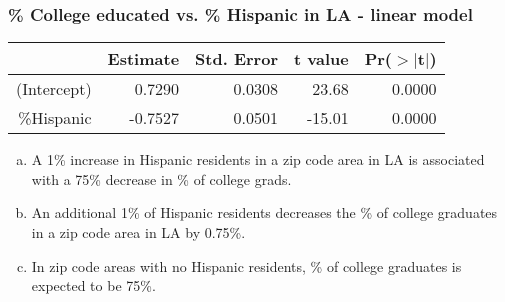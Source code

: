 \documentclass[slidestop,compress,mathserif]{beamer}
\begin{document}

\begin{frame}
\frametitle{\% College educated vs. \% Hispanic in LA - linear model}


{\small
\begin{center}
\begin{tabular}{rrrrr}
  \hline
 & Estimate & Std. Error & t value & Pr($>$$|$t$|$) \\ 
  \hline
(Intercept) & 0.7290 & 0.0308 & 23.68 & 0.0000 \\ 
 \%Hispanic & -0.7527 & 0.0501 & -15.01 & 0.0000 \\ 
   \hline
\end{tabular}
\end{center}
}

\begin{enumerate}[(a)]
\item A 1\% increase in Hispanic residents in a zip code area in LA is associated with a 75\% decrease in \% of college grads.
\item An additional 1\% of Hispanic residents decreases the \% of college graduates in a zip code area in LA by 0.75\%.
\item In zip code areas with no Hispanic residents, \% of college graduates is expected to be 75\%.
\end{enumerate}

\end{frame}

\end{document}
